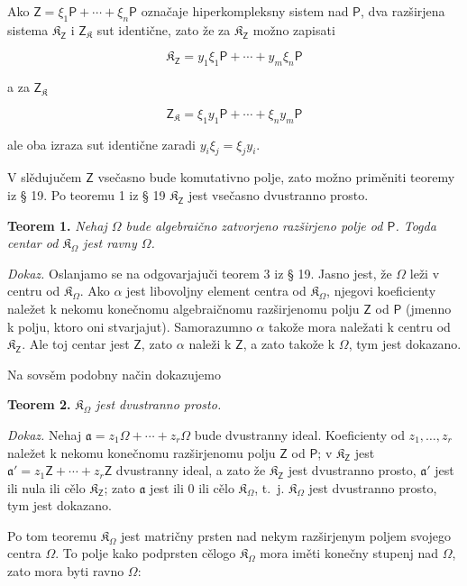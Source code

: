 \documentclass[11pt]{article}
\begin{document}
Ako \(\mathsf{Z}=\xi_1\mathsf P+\cdots+\xi_n\mathsf P\) označaje hiperkompleksny sistem nad \(\mathsf P\), dva razširjena sistema \(\mathfrak K_{\mathsf{Z}}\) i \(\mathsf{Z}_{\mathfrak K}\) sut identične, zato že za \(\mathfrak K_{\mathsf{Z}}\) možno zapisati

\[
\mathfrak K_{\mathsf{Z}}=y_1\xi_1\mathsf P+\cdots+y_m\xi_n\mathsf P
\]

a za \(\mathsf{Z}_{\mathfrak K}\)

\[
\mathsf{Z}_{\mathfrak K}=\xi_1y_1\mathsf P+\cdots+\xi_ny_m\mathsf P
\]

ale oba izraza sut identične zaradi \(y_i\xi_j=\xi_jy_i\).

V slědujučem \(\mathsf{Z}\) vsečasno bude komutativno polje, zato možno priměniti teoremy iz § 19. Po teoremu 1 iz § 19 \(\mathfrak K_{\mathsf{Z}}\) jest vsečasno dvustranno prosto.

\textbf{Teorem 1.} \emph{Nehaj \(\Omega\) bude algebraično zatvorjeno razširjeno polje od \(\mathsf P\). Togda centar od \(\mathfrak K_\Omega\) jest ravny \(\Omega\).}

\emph{Dokaz.} Oslanjamo se na odgovarjajuči teorem 3 iz § 19. Jasno jest, že \(\Omega\) leži v centru od \(\mathfrak K_\Omega\). Ako \(\alpha\) jest libovoljny element centra od \(\mathfrak K_\Omega\), njegovi koeficienty naležet k nekomu konečnomu algebraičnomu razširjenomu polju \(\mathsf{Z}\) od \(\mathsf P\) (jmenno k polju, ktoro oni stvarjajut). Samorazumno \(\alpha\) takože mora naležati k centru od \(\mathfrak K_{\mathsf{Z}}\). Ale toj centar jest \(\mathsf{Z}\), zato \(\alpha\) naleži k \(\mathsf{Z}\), a zato takože k \(\Omega\), tym jest dokazano.

Na sovsěm podobny način dokazujemo

\textbf{Teorem 2.} \emph{\(\mathfrak K_\Omega\) jest dvustranno prosto.}

\emph{Dokaz.} Nehaj \(\mathfrak a=z_1\Omega+\cdots+z_r\Omega\) bude dvustranny ideal. Koeficienty od \(z_1,\ldots,z_r\) naležet k nekomu konečnomu razširjenomu polju \(\mathsf{Z}\) od \(\mathsf P\); v \(\mathfrak K_{\mathsf{Z}}\) jest \(\mathfrak a'=z_1\mathsf{Z}+\cdots+z_r\mathsf{Z}\) dvustranny ideal, a zato že \(\mathfrak K_{\mathsf{Z}}\) jest dvustranno prosto, \(\mathfrak a'\) jest ili nula ili cělo \(\mathfrak K_{\mathsf{Z}}\); zato \(\mathfrak a\) jest ili 0 ili cělo \(\mathfrak K_\Omega\), t.~j. \(\mathfrak K_\Omega\) jest dvustranno prosto, tym jest dokazano.

Po tom teoremu \(\mathfrak K_\Omega\) jest matričny prsten nad nekym razširjenym poljem svojego centra \(\Omega\). To polje kako podprsten cělogo \(\mathfrak K_\Omega\) mora iměti konečny stupenj nad \(\Omega\), zato mora byti ravno \(\Omega\):
\end{document}
